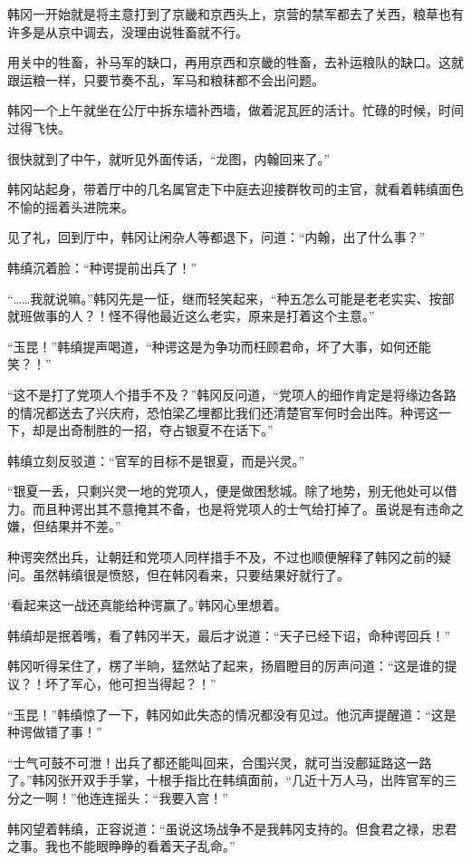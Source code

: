 韩冈一开始就是将主意打到了京畿和京西头上，京营的禁军都去了关西，粮草也有许多是从京中调去，没理由说牲畜就不行。

用关中的牲畜，补马军的缺口，再用京西和京畿的牲畜，去补运粮队的缺口。这就跟运粮一样，只要节奏不乱，军马和粮秣都不会出问题。

韩冈一个上午就坐在公厅中拆东墙补西墙，做着泥瓦匠的活计。忙碌的时候，时间过得飞快。

很快就到了中午，就听见外面传话，“龙图，内翰回来了。”

韩冈站起身，带着厅中的几名属官走下中庭去迎接群牧司的主官，就看着韩缜面色不愉的摇着头进院来。

见了礼，回到厅中，韩冈让闲杂人等都退下，问道：“内翰，出了什么事？”

韩缜沉着脸：“种谔提前出兵了！”

“……我就说嘛。”韩冈先是一怔，继而轻笑起来，“种五怎么可能是老老实实、按部就班做事的人？！怪不得他最近这么老实，原来是打着这个主意。”

“玉昆！”韩缜提声喝道，“种谔这是为争功而枉顾君命，坏了大事，如何还能笑？！”

“这不是打了党项人个措手不及？”韩冈反问道，“党项人的细作肯定是将缘边各路的情况都送去了兴庆府，恐怕梁乙埋都比我们还清楚官军何时会出阵。种谔这一下，却是出奇制胜的一招，夺占银夏不在话下。”

韩缜立刻反驳道：“官军的目标不是银夏，而是兴灵。”

“银夏一丢，只剩兴灵一地的党项人，便是做困愁城。除了地势，别无他处可以借力。而且种谔出其不意掩其不备，也是将党项人的士气给打掉了。虽说是有违命之嫌，但结果并不差。”

种谔突然出兵，让朝廷和党项人同样措手不及，不过也顺便解释了韩冈之前的疑问。虽然韩缜很是愤怒，但在韩冈看来，只要结果好就行了。

‘看起来这一战还真能给种谔赢了。’韩冈心里想着。

韩缜却是抿着嘴，看了韩冈半天，最后才说道：“天子已经下诏，命种谔回兵！”

韩冈听得呆住了，楞了半晌，猛然站了起来，扬眉瞪目的厉声问道：“这是谁的提议？！坏了军心，他可担当得起？！”

“玉昆！”韩缜惊了一下，韩冈如此失态的情况都没有见过。他沉声提醒道：“这是种谔做错了事！”

“士气可鼓不可泄！出兵了都还能叫回来，合围兴灵，就可当没鄜延路这一路了。”韩冈张开双手手掌，十根手指比在韩缜面前，“几近十万人马，出阵官军的三分之一啊！”他连连摇头：“我要入宫！”

韩冈望着韩缜，正容说道：“虽说这场战争不是我韩冈支持的。但食君之禄，忠君之事。我也不能眼睁睁的看着天子乱命。”

